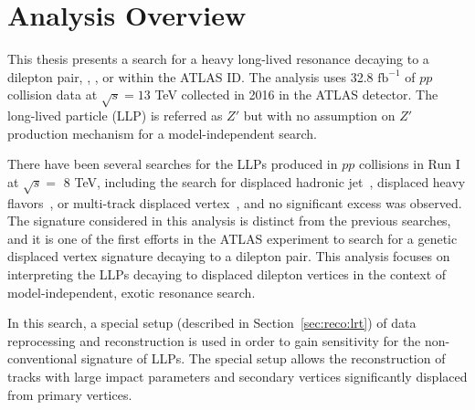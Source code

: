 \chapter{Analysis Overview}
\label{chap:analysis_overview}

This thesis presents a search for a heavy long-lived resonance decaying to a dilepton pair, \mumu, \ee, or \emu within the ATLAS ID. The analysis uses 32.8 $\mathrm{fb^{-1}}$ of $pp$ collision data at $\sqrt{s}=13$ TeV collected in 2016 in the ATLAS detector. The long-lived particle (LLP) is referred as $Z'$ but with no assumption on $Z'$ production mechanism for a model-independent search.

There have been several searches for the LLPs produced in $pp$ collisions in Run I at $\sqrt{s} =$ 8 TeV, including the search for displaced hadronic jet~\cite{Blackburn:1550730}, displaced heavy flavors~\cite{Harris:1512932}, or multi-track displaced vertex~\cite{Aad:2015rba}, and no significant excess was observed. The signature considered in this analysis is distinct from the previous searches, and it is one of the first efforts in the ATLAS experiment to search for a genetic displaced vertex signature decaying to a dilepton pair. This analysis focuses on interpreting the LLPs decaying to displaced dilepton vertices in the context of model-independent, exotic resonance search.

In this search, a special setup (described in Section~\ref{sec:reco:lrt}) of data reprocessing and reconstruction is used in order to gain sensitivity for the non-conventional signature of LLPs. The special setup allows the reconstruction of tracks with large impact parameters and secondary vertices significantly displaced from primary vertices. 
